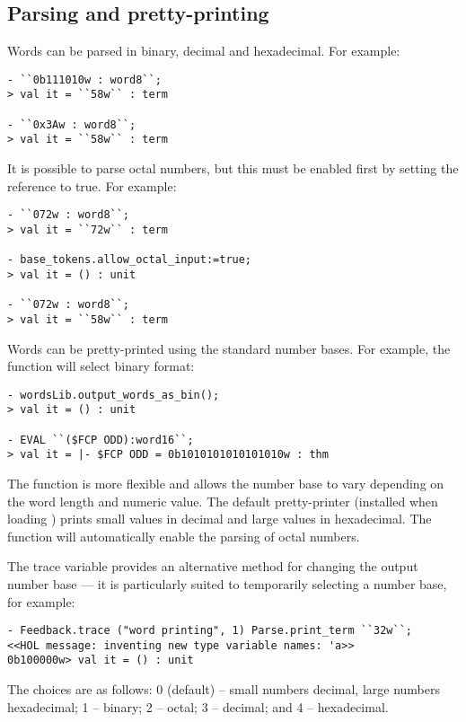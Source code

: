 \subsection{Parsing and pretty-printing}

Words can be parsed in binary, decimal and hexadecimal.   For example:
\begin{session}
\begin{verbatim}
- ``0b111010w : word8``;
> val it = ``58w`` : term

- ``0x3Aw : word8``;
> val it = ``58w`` : term
\end{verbatim}
\end{session}
It is possible to parse octal numbers, but this must be enabled first by setting the reference  to true.  For example:
\begin{session}
\begin{verbatim}
- ``072w : word8``;
> val it = ``72w`` : term

- base_tokens.allow_octal_input:=true;
> val it = () : unit

- ``072w : word8``;
> val it = ``58w`` : term
\end{verbatim}
\end{session}

Words can be pretty-printed using the standard number bases. For example, the function
 will select binary format:
\begin{session}
\begin{verbatim}
- wordsLib.output_words_as_bin();
> val it = () : unit

- EVAL ``($FCP ODD):word16``;
> val it = |- $FCP ODD = 0b1010101010101010w : thm
\end{verbatim}
\end{session}
The function  is more flexible and allows the number base to vary depending on
the word length and numeric value.  The default pretty-printer (installed when loading ) prints small values in decimal and large values in hexadecimal.
The function  will automatically enable the parsing of octal numbers.

The trace variable  provides an alternative method for changing the output number base --- it is particularly suited to temporarily selecting a number base, for example:
\begin{session}
\begin{verbatim}
- Feedback.trace ("word printing", 1) Parse.print_term ``32w``;
<<HOL message: inventing new type variable names: 'a>>
0b100000w> val it = () : unit
\end{verbatim}
\end{session}
The choices are as follows: 0 (default) -- small numbers decimal, large numbers hexadecimal; 1 -- binary; 2 -- octal; 3 -- decimal; and 4 -- hexadecimal.


